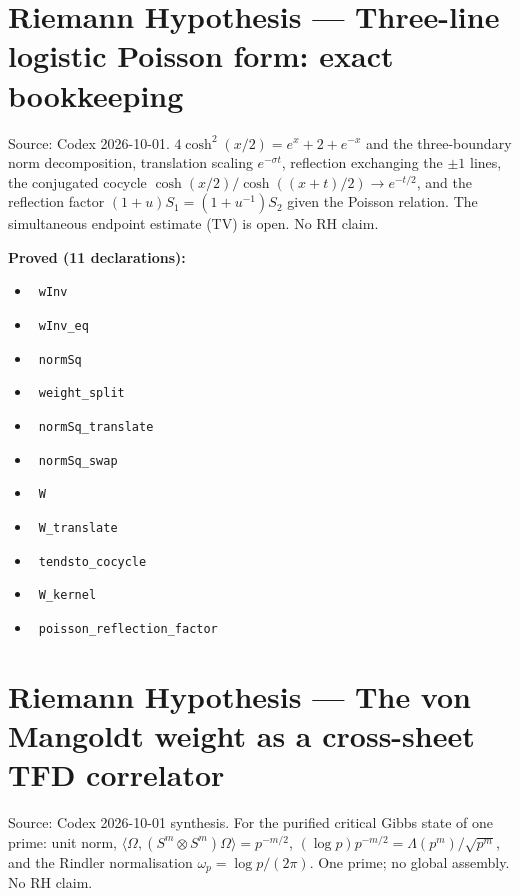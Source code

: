 \documentclass{report}
\theoremstyle{definition}
\begin{document}
\section{Riemann Hypothesis --- Three-line logistic Poisson form: exact bookkeeping}
Source: Codex 2026-10-01. $4\cosh^2(x/2)=e^x+2+e^{-x}$ and the three-boundary norm decomposition, translation scaling $e^{-\sigma t}$, reflection exchanging the $\pm1$ lines, the conjugated cocycle $\cosh(x/2)/\cosh((x+t)/2)\to e^{-t/2}$, and the reflection factor $(1+u)S_1=(1+u^{-1})S_2$ given the Poisson relation. The simultaneous endpoint estimate (TV) is open. No RH claim.

\noindent\textbf{Proved (11 declarations):}
\begin{itemize}
  \item {}\leanok\ \texttt{wInv}
  \item {}\leanok\ \texttt{wInv\_eq}
  \item {}\leanok\ \texttt{normSq}
  \item {}\leanok\ \texttt{weight\_split}
  \item {}\leanok\ \texttt{normSq\_translate}
  \item {}\leanok\ \texttt{normSq\_swap}
  \item {}\leanok\ \texttt{W}
  \item {}\leanok\ \texttt{W\_translate}
  \item {}\leanok\ \texttt{tendsto\_cocycle}
  \item {}\leanok\ \texttt{W\_kernel}
  \item {}\leanok\ \texttt{poisson\_reflection\_factor}
\end{itemize}

\section{Riemann Hypothesis --- The von Mangoldt weight as a cross-sheet TFD correlator}
Source: Codex 2026-10-01 synthesis. For the purified critical Gibbs state of one prime: unit norm, $\langle\Omega,(S^m\otimes S^m)\Omega\rangle=p^{-m/2}$, $(\log p)p^{-m/2}=\Lambda(p^m)/\sqrt{p^m}$, and the Rindler normalisation $\omega_p=\log p/(2\pi)$. One prime; no global assembly. No RH claim.
\end{document}
